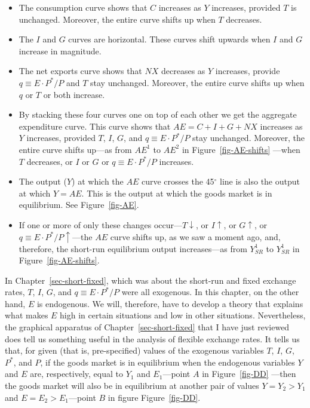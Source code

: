 \documentclass[
  letterpaper,
]{book}
\providecommand{\tightlist}{%
  \setlength{\itemsep}{0pt}\setlength{\parskip}{0pt}}\usepackage{longtable,booktabs,array}
\theoremstyle{plain}
\theoremstyle{remark}
\begin{document}
\begin{itemize}
\tightlist
\item
  The consumption curve shows that \(C\) increases as \(Y\) increases,
  provided \(T\) is unchanged. Moreover, the entire curve shifts up when
  \(T\) decreases.
\item
  The \(I\) and \(G\) curves are horizontal. These curves shift upwards
  when \(I\) and \(G\) increase in magnitude.
\item
  The net exports curve shows that \(NX\) decreases as \(Y\) increases,
  provide \(q\equiv E\cdot P^*/P\) and \(T\) stay unchanged. Moreover,
  the entire curve shifts up when \(q\) or \(T\) or both increase.
\item
  By stacking these four curves one on top of each other we get the
  aggregate expenditure curve. This curve shows that \(AE=C+I+G+NX\)
  increases as \(Y\) increases, provided \(T\), \(I\), \(G\), and
  \(q\equiv E\cdot P^*/P\) stay unchanged. Moreover, the entire curve
  shifts up---as from \(AE^1\) to \(AE^2\) in Figure~\ref{fig-AE-shifts}
  ---when \(T\) decreases, or \(I\) or \(G\) or \(q\equiv E\cdot P^*/P\)
  increases.
\item
  The output (\(Y\)) at which the \(AE\) curve crosses the
  45\(^{\circ}\) line is also the output at which \(Y=AE\). This is the
  output at which the goods market is in equilibrium. See
  Figure~\ref{fig-AE}.
\item
  If one or more of only these changes occur---\(T\downarrow\), or
  \(I\uparrow\), or \(G\uparrow\), or
  \(q\equiv E\cdot P^*/P\uparrow\)---the \(AE\) curve shifts up, as we
  saw a moment ago, and, therefore, the short-run equilibrium output
  increases---as from \(Y_{SR}^1\) to \(Y_{SR}^1\) in
  Figure~\ref{fig-AE-shifts}.
\end{itemize}

In Chapter~\ref{sec-short-fixed}, which was about the short-run and
fixed exchange rates, \(T\), \(I\), \(G\), and \(q\equiv E\cdot P^*/P\)
were all exogenous. In this chapter, on the other hand, \(E\) is
endogenous. We will, therefore, have to develop a theory that explains
what makes \(E\) high in certain situations and low in other situations.
Nevertheless, the graphical apparatus of Chapter~\ref{sec-short-fixed}
that I have just reviewed does tell us something useful in the analysis
of flexible exchange rates. It tells us that, for given (that is,
pre-specified) values of the exogenous variables \(T\), \(I\), \(G\),
\(P^*\), and \(P\), if the goods market is in equilibrium when the
endogenous variables \(Y\) and \(E\) are, respectively, equal to \(Y_1\)
and \(E_1\)---point \(A\) in Figure~\ref{fig-DD} ---then the goods
market will also be in equilibrium at another pair of values
\(Y=Y_2>Y_1\) and \(E=E_2>E_1\)---point \(B\) in figure
Figure~\ref{fig-DD}.
\end{document}
